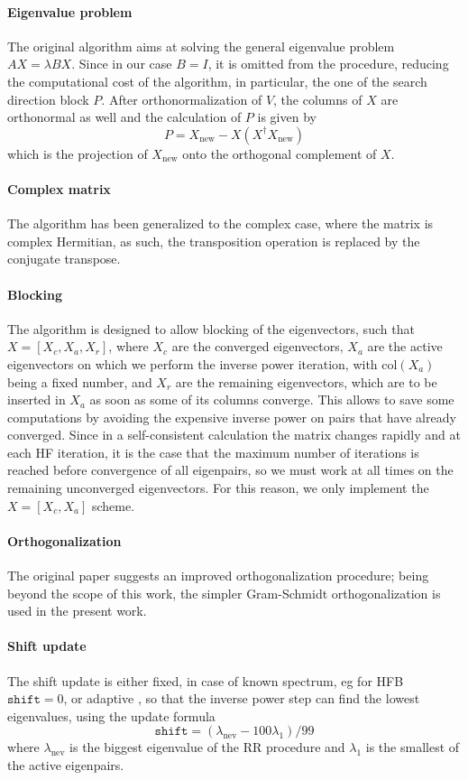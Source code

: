 \paragraph{Eigenvalue problem} The original algorithm aims at solving the general eigenvalue problem $AX = \lambda BX$. Since in our case $B=I$, it is omitted from the procedure, reducing the computational cost of the algorithm, in particular, the one of the search direction block $P$. After orthonormalization of $V$, the columns of $X$ are orthonormal as well and the calculation of $P$ is given by
\begin{equation}
    \label{eq:gcg_p}
    P = X_\text{new} - X(X^\dagger X_\text{new})
\end{equation}
which is the projection of $X_\text{new}$ onto the orthogonal complement of $X$.
\paragraph{Complex matrix} The algorithm has been generalized to the complex case, where the matrix is complex Hermitian, as such, the transposition operation is replaced by the conjugate transpose.
\paragraph{Blocking} The algorithm is designed to allow blocking of the eigenvectors, such that $X=[X_c, X_a, X_r]$, where $X_c$ are the converged eigenvectors, $X_a$ are the active eigenvectors on which we perform the inverse power iteration, with $\text{col}(X_a)$ being a fixed number, and $X_r$ are the remaining eigenvectors, which are to be inserted in $X_a$ as soon as some of its columns converge. This allows to save some computations by avoiding the expensive inverse power on pairs that have already converged. Since in a self-consistent calculation the matrix changes rapidly and at each HF iteration, it is the case that the maximum number of iterations is reached before convergence of all eigenpairs, so we must work at all times on the remaining unconverged eigenvectors. For this reason, we only implement the $X=[X_c, X_a]$ scheme.
\paragraph{Orthogonalization} The original paper \cite{GCG1} suggests an improved orthogonalization procedure; being beyond the scope of this work, the simpler Gram-Schmidt \cite{GM} orthogonalization is used in the present work.
\paragraph{Shift update} The shift update is either fixed, in case of known spectrum, eg for HFB $\texttt{shift} = 0$, or adaptive \cite{GCG1}, so that the inverse power step can find the lowest eigenvalues, using the update formula
\begin{equation}
    \label{eq:update_shift}
    \texttt{shift}=(\lambda_\text{nev} - 100\lambda_1)/99
\end{equation}
where $\lambda_\text{nev}$ is the biggest eigenvalue of the RR procedure and $\lambda_1$ is the smallest of the active eigenpairs.
